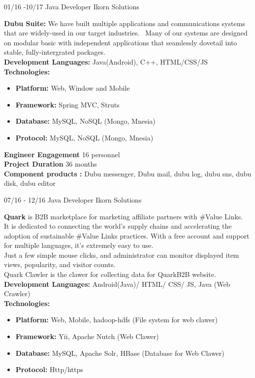 \documentclass[]{friggeri-cv}
\begin{document}
\begin{entrylist}
  \entry
    {01/16 -10/17}
    {Java Developer}
    {Ikorn Solutions}
   {\textbf{ Dubu Suite:} We have built multiple applications and communications systems that are widely-used in our target industries.~
	 Many of our systems are designed on modular basic with independent applications that seamlessly dovetail into stable, fully-intergrated packages.\\

	 \textbf{Development Languages:} Java(Android), C++, HTML/CSS/JS\\
	 \textbf{Technologies:}~
			\begin{itemize}
				\item \textbf{Platform:} Web, Window and Mobile
				\item \textbf{Framework:} Spring MVC, Struts
				\item \textbf{Database:} MySQL, NoSQL (Mongo, Mnesia)
				\item \textbf{Protocol:} MySQL, NoSQL (Mongo, Mnesia)
			\end{itemize}
		 \textbf{Engineer Engagement} 16 personnel\\
		 \textbf{Project Duration} 36 months\\
		 \textbf{Component products :} Dubu messenger, Dubu mail, dubu log, dubu sns, dubu disk, dubu editor\\
}
\end{entrylist}

\begin{entrylist}
\entry
    {07/16 - 12/16}
    {Java Developer}
    {Ikorn Solutions}
	{\textbf{ Quark}  is B2B marketplace for marketing affiliate partners with \#Value Links.\\ 
	It is dedicated to connecting the world’s supply chains and accelerating the adoption of sustainable \#Value Links practices.
	With a free account and support for multiple languages, it’s extremely easy to use.\\
	 Just a few simple mouse clicks, and administrator can monitor displayed item views, popularity, and visitor counts.\\
	Quark Clawler is the clawer for collecting data  for QuarkB2B website.\\

	 \textbf{Development Languages:} Android(Java)/ HTML/ CSS/ JS, Java (Web Crawler) \\ 
	 \textbf{Technologies:}~
			\begin{itemize}
				\item \textbf{Platform:} Web,  Mobile, hadoop-hdfs (File system for web clawer)
				\item \textbf{Framework:} Yii, Apache Nutch (Web Clawer)
				\item \textbf{Database:} MySQL, Apache Solr, HBase (Database for Web Clawer)
				\item \textbf{Protocol:} Http/https
			\end{itemize}
	}
\end{entrylist}
\end{document}
